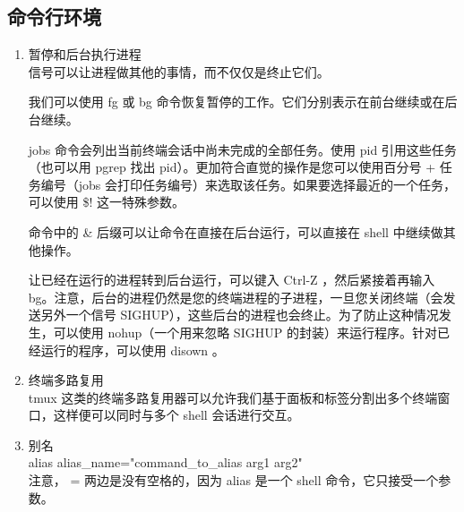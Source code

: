\documentclass{ctexart}
\begin{document}
\subsection{命令行环境}
\begin{enumerate}
\item 暂停和后台执行进程\\
信号可以让进程做其他的事情，而不仅仅是终止它们。

我们可以使用 fg 或 bg 命令恢复暂停的工作。它们分别表示在前台继续或在后台继续。

jobs 命令会列出当前终端会话中尚未完成的全部任务。使用 pid 引用这些任务（也可以用 pgrep 找出 pid）。更加符合直觉的操作是您可以使用百分号 + 任务编号（jobs 会打印任务编号）来选取该任务。如果要选择最近的一个任务，可以使用 \$! 这一特殊参数。

命令中的 \& 后缀可以让命令在直接在后台运行，可以直接在 shell 中继续做其他操作。

让已经在运行的进程转到后台运行，可以键入 Ctrl-Z ，然后紧接着再输入 bg。注意，后台的进程仍然是您的终端进程的子进程，一旦您关闭终端（会发送另外一个信号 SIGHUP），这些后台的进程也会终止。为了防止这种情况发生，可以使用 nohup（一个用来忽略 SIGHUP 的封装）来运行程序。针对已经运行的程序，可以使用 disown 。

\item 终端多路复用\\
tmux 这类的终端多路复用器可以允许我们基于面板和标签分割出多个终端窗口，这样便可以同时与多个 shell 会话进行交互。
\item 别名\\
alias alias\_name="command\_to\_alias arg1 arg2"\\
注意， = 两边是没有空格的，因为 alias 是一个 shell 命令，它只接受一个参数。


\end{enumerate}
\end{document}
